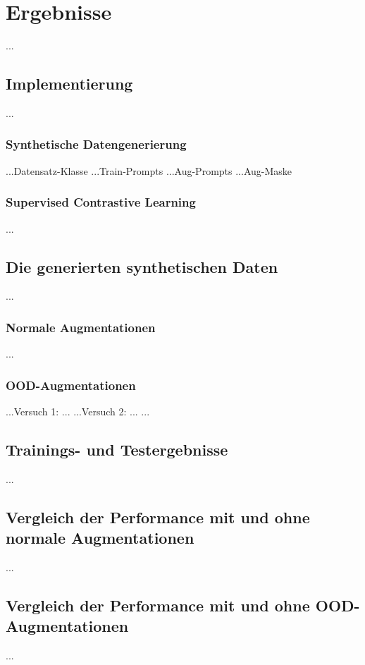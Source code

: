 \chapter{Ergebnisse}

...

\section{Implementierung}

...

\subsection{Synthetische Datengenerierung}

...Datensatz-Klasse
...Train-Prompts
...Aug-Prompts
...Aug-Maske

\subsection{Supervised Contrastive Learning}

...

\section{Die generierten synthetischen Daten}

...

\subsection{Normale Augmentationen}

...

\subsection{OOD-Augmentationen}

...Versuch 1: ...
...Versuch 2: ...
...

\section{Trainings- und Testergebnisse}

...

\section{Vergleich der Performance mit und ohne normale Augmentationen}

...

\section{Vergleich der Performance mit und ohne OOD-Augmentationen}

...